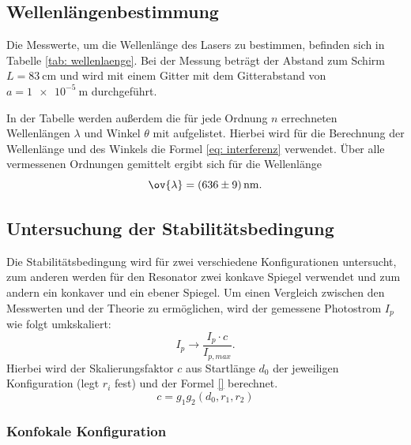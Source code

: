 \subsection{Wellenlängenbestimmung}
Die Messwerte, um die Wellenlänge des Lasers zu bestimmen, befinden sich in Tabelle  \ref{tab: wellenlaenge}.
Bei der Messung beträgt der Abstand zum Schirm $L=\SI{83}{\centi\meter}$ %
und wird mit einem Gitter mit dem Gitterabstand von $a=\SI{1e-5}{\meter}$ durchgeführt. %

In der Tabelle werden außerdem die für jede Ordnung $n$ errechneten Wellenlängen $\lambda$ und Winkel $\theta$
mit aufgelistet. Hierbei wird für die Berechnung der Wellenlänge und des Winkels die Formel \eqref{eq: interferenz} verwendet. %
Über alle vermessenen Ordnungen gemittelt ergibt sich für die Wellenlänge
\begin{equation}
  \label{eq: mittelwert_wellenlaenge}
  \ov{\lambda}=\SI{636\pm9}{\nano\meter}.
\end{equation}
\FloatBarrier
\FloatBarrier
\subsection{Untersuchung der Stabilitätsbedingung} %
Die Stabilitätsbedingung wird für zwei verschiedene Konfigurationen untersucht,
zum anderen werden für den Resonator zwei konkave Spiegel verwendet und zum andern %
ein konkaver und ein ebener Spiegel. %
Um einen Vergleich zwischen den Messwerten und der Theorie zu ermöglichen, wird der gemessene
Photostrom $I_p$ wie folgt umkskaliert: %
\begin{equation*}
  I_p \rightarrow \frac{I_p\cdot c}{I_{p,max}}.
\end{equation*}
Hierbei wird der Skalierungsfaktor $c$ aus Startlänge $d_0$ der jeweiligen Konfiguration (legt $r_i$ fest) und der Formel
\eqref{} berechnet. %
\begin{equation*}
  c=g_1g_2(d_0, r_1, r_2)
\end{equation*}

\FloatBarrier
\FloatBarrier
\subsubsection{Konfokale Konfiguration} %

